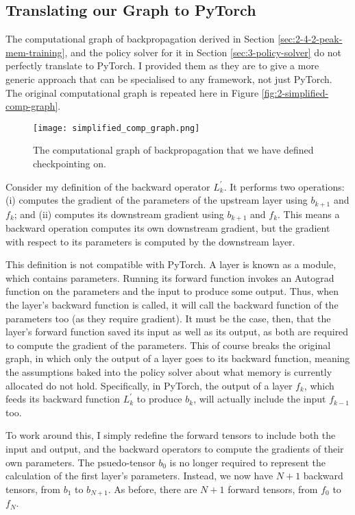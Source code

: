 \subsection{Translating our Graph to PyTorch}
The computational graph of backpropagation derived in Section \ref{sec:2-4-2-peak-mem-training}, and the policy solver for it in Section \ref{sec:3-policy-solver} do not perfectly translate to PyTorch.
I provided them as they are to give a more generic approach that can be specialised to any framework, not just PyTorch.
The original computational graph is repeated here in Figure \ref{fig:2-simplified-comp-graph}.

\begin{figure}[h]
    \centering
    \texttt{[image: simplified\_comp\_graph.png]}
    \caption{The computational graph of backpropagation that we have defined checkpointing on.}
    \label{fig:3-simplified-comp-graph}
\end{figure}

Consider my definition of the backward operator \(L_k^\prime\).
It performs two operations: (i) computes the gradient of the parameters of the upstream layer using \(b_{k+1}\) and \(f_k\); and (ii) computes its downstream gradient using \(b_{k+1}\) and \(f_k\).
This means a backward operation computes its own downstream gradient, but the gradient with respect to its parameters is computed by the downstream layer.

This definition is not compatible with PyTorch.
A layer is known as a module, which contains parameters.
Running its forward function invokes an Autograd function on the parameters and the input to produce some output.
Thus, when the layer's backward function is called, it will call the backward function of the parameters too (as they require gradient).
It must be the case, then, that the layer's forward function saved its input as well as its output, as both are required to compute the gradient of the parameters.
This of course breaks the original graph, in which only the output of a layer goes to its backward function, meaning the assumptions baked into the policy solver about what memory is currently allocated do not hold.
Specifically, in PyTorch, the output of a layer \(f_k\), which feeds its backward function \(L_k^\prime\) to produce \(b_k\), will actually include the input \(f_{k-1}\) too.

To work around this, I simply redefine the forward tensors to include both the input and output, and the backward operators to compute the gradients of their own parameters.
The psuedo-tensor \(b_0\) is no longer required to represent the calculation of the first layer's parameters.
Instead, we now have \(N+1\) backward tensors, from \(b_1\) to \(b_{N+1}\).
As before, there are \(N+1\) forward tensors, from \(f_0\) to \(f_N\).

